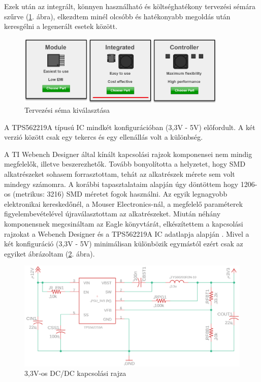 \documentclass[../main.tex]{subfiles}
\begin{document}
            Ezek után az integrált, könnyen használható és költséghatékony tervezési sémára szűrve (\ref{fig:ti_we_des_int_etu_ce_method}. ábra), elkezdtem minél olcsóbb és hatékonyabb megoldás után keresgélni a legenerált esetek között.
            
            \begin{figure}[h!]
                \centering
                    \includegraphics[width=10cm]{resources/pcb_res/ti_we_des_int_etu_ce_method_2.png}
                \caption{Tervezési séma kiválasztása\cite{ti_webench}}
                \label{fig:ti_we_des_int_etu_ce_method}
            \end{figure}
            
            A TPS562219A típusú IC mindkét konfigurációban (3,3V - 5V) előfordult. A két verzió között %
            csak egy tekercs és egy ellenállás volt a különbség.
            
            A TI Webench Designer által kínált kapcsolási rajzok komponensei nem mindig megfelelők, illetve beszerezhetők. Tovább bonyolította a helyzetet, hogy SMD alkatrészeket sohasem forrasztottam, tehát az alkatrészek mérete sem volt mindegy számomra. A korábbi tapasztalataim alapján úgy döntöttem hogy 1206-os (metrikus: 3216) SMD méretet fogok használni. Az egyik legnagyobb elektronikai kereskedőnél, a Mouser Electronics-nál, a megfelelő paraméterek figyelembevételével újraválasztottam az alkatrészeket. Miután néhány komponensnek megcsináltam az Eagle könyvtárát, elkészítettem a kapcsolási rajzokat a Webench Designer és a TPS562219A IC adatlapja alapján \cite{ds_tps56}. Mivel a két konfiguráció (3,3V - 5V) minimálisan különbözik egymástól ezért csak az egyiket ábrázoltam (\ref{fig:schematic_3v3}. ábra).
            
            \begin{figure}[h!]
                \centering
                    \includegraphics[width=12cm]{resources/pcb_res/schematic_3v3.png}
                \caption{3,3V-os DC/DC kapcsolási rajza}
                \label{fig:schematic_3v3}
            \end{figure}
            
\end{document}
